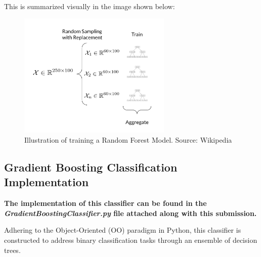 \begin{appendices}
    This is summarized visually in the image shown below:

    \begin{figure}[H]
    \centering
    \includegraphics[width=0.65\textwidth]{images/rf_train.png}
    \caption{Illustration of training a Random Forest Model. Source: Wikipedia}
    \label{fig:rf}
    \end{figure}
    \FloatBarrier

  \subsection{Gradient Boosting Classification Implementation} \label{app:sec:gb_implementation}

  \textbf{The implementation of this classifier can be found in the \textit{GradientBoostingClassifier.py} file attached along with this submission.}

  Adhering to the Object-Oriented (OO) paradigm in Python, this classifier is constructed to address binary classification tasks through an ensemble of decision trees.


\end{appendices}
